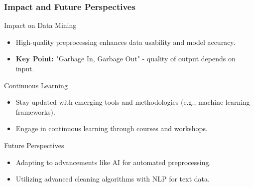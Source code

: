\documentclass{beamer}
\begin{document}
\begin{frame}[fragile]
    \frametitle{Impact and Future Perspectives}
    \begin{block}{Impact on Data Mining}
        \begin{itemize}
            \item High-quality preprocessing enhances data usability and model accuracy.
            \item \textbf{Key Point:} "Garbage In, Garbage Out" - quality of output depends on input.
        \end{itemize}
    \end{block}

    \begin{block}{Continuous Learning}
        \begin{itemize}
            \item Stay updated with emerging tools and methodologies (e.g., machine learning frameworks).
            \item Engage in continuous learning through courses and workshops.
        \end{itemize}
    \end{block}
    
    \begin{block}{Future Perspectives}
        \begin{itemize}
            \item Adapting to advancements like AI for automated preprocessing.
            \item Utilizing advanced cleaning algorithms with NLP for text data.
        \end{itemize}
    \end{block}
\end{frame}
\end{document}
